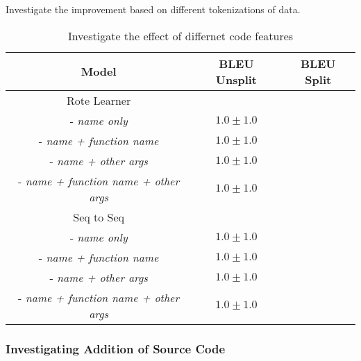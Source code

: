 Investigate the improvement based on different tokenizations of data.

\begin{table}[h!]
\begin{center}
\begin{tabular}{ c | c | c }
    Model                               & BLEU Unsplit            & BLEU Split  \\
    \hline
    \hline
    Rote Learner                        &                  & \\    
    - \textit{name only}                & $1.0 \pm 1.0 $   & \\
    - \textit{name + function name}     & $1.0 \pm 1.0 $   & \\
    - \textit{name + other args}        & $1.0 \pm 1.0 $   & \\
    - \textit{name + function name + other args}     & $1.0 \pm 1.0 $   & \\
    \hline
    \hline
    Seq to Seq                          &                  &  \\
    - \textit{name only}                & $1.0 \pm 1.0 $   & \\
    - \textit{name + function name}     & $1.0 \pm 1.0 $   & \\
    - \textit{name + other args}        & $1.0 \pm 1.0 $   & \\
    - \textit{name + function name + other args}     & $1.0 \pm 1.0 $   & \\
    \hline
\end{tabular}
\caption {Investigate the effect of differnet code features}
\label{table:tokenization}
\end{center}
\end{table}




\subsubsection{Investigating Addition of Source Code} %
\label{subs:investigating_tokenizations_with_source_code}


